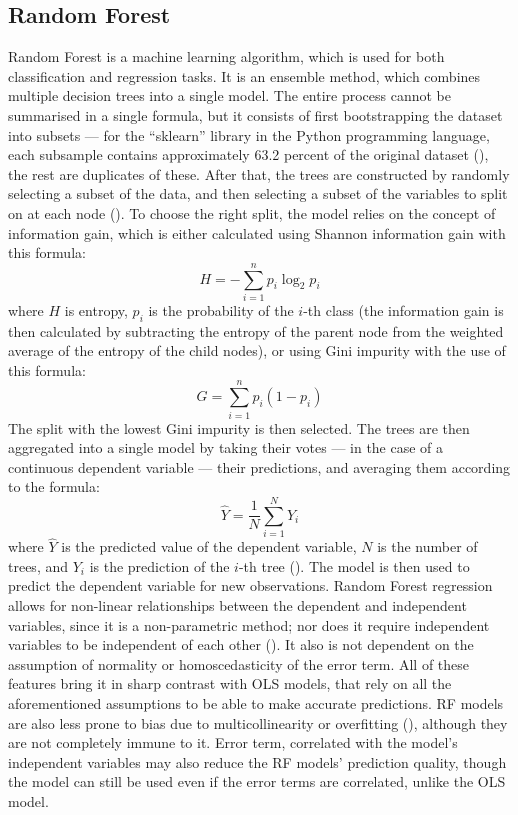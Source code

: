 \documentclass[12pt]{report}
\begin{document}
\subsection{Random Forest}
Random Forest is a machine learning algorithm, which is used for both classification and regression tasks. It is an ensemble method, which combines multiple decision trees into a single model. The entire process cannot be summarised in a single formula, but it consists of first bootstrapping the dataset into subsets --- for the ``sklearn'' library in the Python programming language, each subsample contains approximately 63.2 percent of the original dataset (\cite{Steorts15}), the rest are duplicates of these. After that, the trees are constructed by randomly selecting a subset of the data, and then selecting a subset of the variables to split on at each node (\cite[p.160]{cutler2011}). To choose the right split, the model relies on the concept of information gain, which is either calculated using Shannon information gain with this formula:
\begin{equation}
	H = -\sum_{i=1}^{n} p_i \log_2 p_i
\end{equation}
where $H$ is entropy, $p_i$ is the probability of the $i$-th class (the information gain is then calculated by subtracting the entropy of the parent node from the weighted average of the entropy of the child nodes), or using Gini impurity with the use of this formula:
\begin{equation}
	G = \sum_{i=1}^{n} p_i (1 - p_i)
\end{equation}
The split with the lowest Gini impurity is then selected. The trees are then aggregated into a single model by taking their votes --- in the case of a continuous dependent variable --- their predictions, and averaging them according to the formula:
\begin{equation}
	\hat{Y} = \frac{1}{N} \sum_{i=1}^{N} Y_i
\end{equation}
where $\hat{Y}$ is the predicted value of the dependent variable, $N$ is the number of trees, and $Y_i$ is the prediction of the $i$-th tree (\cite[p. 159]{cutler2011}). The model is then used to predict the dependent variable for new observations.
Random Forest regression allows for non-linear relationships between the dependent and independent variables, since it is a non-parametric method; nor does it require independent variables to be independent of each other (\cite{Stekhoven2011}). It also is not dependent on the assumption of normality or homoscedasticity of the error term. All of these features bring it in sharp contrast with OLS models, that rely on all the aforementioned assumptions to be able to make accurate predictions. RF models are also less prone to bias due to multicollinearity or overfitting (\cite{lindner2022}), although they are not completely immune to it. Error term, correlated with the model's independent variables may also reduce the RF models' prediction quality, though the model can still be used even if the error terms are correlated, unlike the OLS model.
\end{document}
